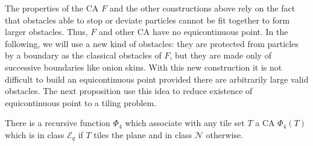 \documentclass{llncs}
\newcommand{\acf}{F}
\newcommand{\equpt}{\mathcal{E}_q}
\newcommand{\nono}{\mathcal{N}}
\newcommand{\phiemboit}{\Phi_4}
\begin{document}
The properties of the CA $\acf$ and the other constructions above rely
on the fact that obstacles able to stop or deviate particles cannot be
fit together to form larger obstacles. Thus, $\acf$ and other CA have
no equicontinuous point. In the following, we will use a new kind of
obstacles: they are protected from particles by a boundary as the
classical obstacles of $\acf$, but they are made only of successive
boundaries like onion skins. With this new construction it is not
difficult to build an equicontinuous point provided there are
arbitrarily large valid obstacles. The next proposition use this idea
to reduce existence of equicontinuous point to a tiling problem.

\begin{proposition}
  \label{prop:emboit}
  There is a recursive function $\phiemboit$ which associate with any
  tile set $T$ a CA $\phiemboit(T)$ which is in class $\equpt$ if $T$
  tiles the plane and in class $\nono$ otherwise.
\end{proposition}
\end{document}
